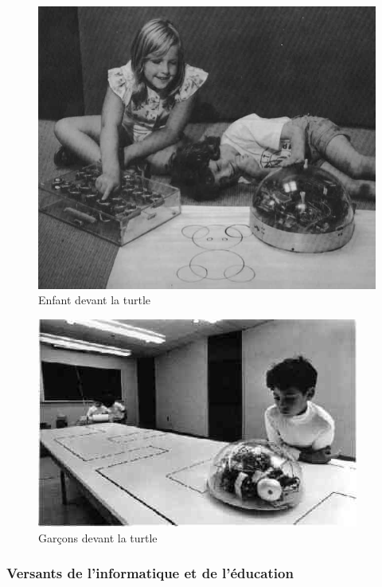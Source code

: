 \begin{minipage}[H]{0.5\linewidth}
  \begin{figure}[H]
  \centering
  \includegraphics[width=\textwidth]{../resources/illustrations/logo_turtle_2}
  \caption{Enfant devant la turtle}
  \end{figure}
\end{minipage}
\begin{minipage}[H]{0.5\linewidth}
  \begin{figure}[H]
  \centering
  \includegraphics[width=\textwidth]{../resources/illustrations/logo_turtle_3}
  \caption{Garçons devant la turtle}
  \end{figure}
\end{minipage}

\subsubsection{Versants de l'informatique et de l'éducation}
